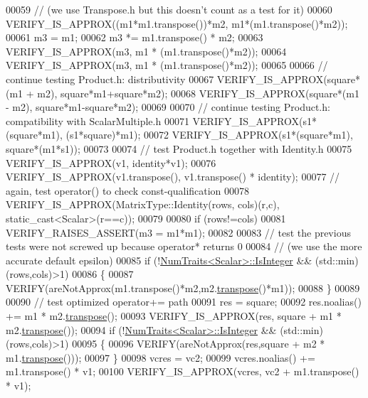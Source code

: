 \begin{DoxyCode}
00059   \textcolor{comment}{// (we use Transpose.h but this doesn't count as a test for it)}
00060   VERIFY\_IS\_APPROX((m1*m1.transpose())*m2,  m1*(m1.transpose()*m2));
00061   m3 = m1;
00062   m3 *= m1.transpose() * m2;
00063   VERIFY\_IS\_APPROX(m3,                      m1 * (m1.transpose()*m2));
00064   VERIFY\_IS\_APPROX(m3,                      m1 * (m1.transpose()*m2));
00065 
00066   \textcolor{comment}{// continue testing Product.h: distributivity}
00067   VERIFY\_IS\_APPROX(square*(m1 + m2),        square*m1+square*m2);
00068   VERIFY\_IS\_APPROX(square*(m1 - m2),        square*m1-square*m2);
00069 
00070   \textcolor{comment}{// continue testing Product.h: compatibility with ScalarMultiple.h}
00071   VERIFY\_IS\_APPROX(s1*(square*m1),          (s1*square)*m1);
00072   VERIFY\_IS\_APPROX(s1*(square*m1),          square*(m1*s1));
00073 
00074   \textcolor{comment}{// test Product.h together with Identity.h}
00075   VERIFY\_IS\_APPROX(v1,                      identity*v1);
00076   VERIFY\_IS\_APPROX(v1.transpose(),          v1.transpose() * identity);
00077   \textcolor{comment}{// again, test operator() to check const-qualification}
00078   VERIFY\_IS\_APPROX(MatrixType::Identity(rows, cols)(r,c), static\_cast<Scalar>(r==c));
00079 
00080   \textcolor{keywordflow}{if} (rows!=cols)
00081      VERIFY\_RAISES\_ASSERT(m3 = m1*m1);
00082 
00083   \textcolor{comment}{// test the previous tests were not screwed up because operator* returns 0}
00084   \textcolor{comment}{// (we use the more accurate default epsilon)}
00085   \textcolor{keywordflow}{if} (!\hyperlink{group___core___module_struct_eigen_1_1_num_traits}{NumTraits<Scalar>::IsInteger} && (std::min)(rows,cols)>1)
00086   \{
00087     VERIFY(areNotApprox(m1.transpose()*m2,m2.\hyperlink{group___core___module_ac8952c19644a4ac7e41bea45c19b909c}{transpose}()*m1));
00088   \}
00089 
00090   \textcolor{comment}{// test optimized operator+= path}
00091   res = square;
00092   res.noalias() += m1 * m2.\hyperlink{group___core___module_ac8952c19644a4ac7e41bea45c19b909c}{transpose}();
00093   VERIFY\_IS\_APPROX(res, square + m1 * m2.\hyperlink{group___core___module_ac8952c19644a4ac7e41bea45c19b909c}{transpose}());
00094   \textcolor{keywordflow}{if} (!\hyperlink{group___core___module_struct_eigen_1_1_num_traits}{NumTraits<Scalar>::IsInteger} && (std::min)(rows,cols)>1)
00095   \{
00096     VERIFY(areNotApprox(res,square + m2 * m1.\hyperlink{group___core___module_ac8952c19644a4ac7e41bea45c19b909c}{transpose}()));
00097   \}
00098   vcres = vc2;
00099   vcres.noalias() += m1.transpose() * v1;
00100   VERIFY\_IS\_APPROX(vcres, vc2 + m1.transpose() * v1);

\end{DoxyCode}
